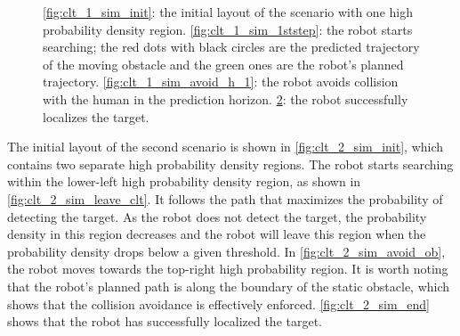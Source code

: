 \documentclass[twocolumn,10pt]{asme2e}
\begin{document}
\begin{figure}
\begin{subfigure}[b]{0.2\textwidth}
		\caption{}\label{fig:clt_1_sim_end}
	\end{subfigure}
	\caption{\cref{fig:clt_1_sim_init}: the initial layout of the scenario with one high probability density region. \cref{fig:clt_1_sim_1ststep}: the robot starts searching; the red dots with black circles are the predicted trajectory of the moving obstacle and the green ones are the robot's planned trajectory. \cref{fig:clt_1_sim_avoid_h_1}: the robot avoids collision with the human in the prediction horizon. \cref{fig:clt_1_sim_end}: the robot successfully localizes the target.}
\end{figure}

The initial layout of the second scenario is shown in \cref{fig:clt_2_sim_init}, which contains two separate high probability density regions.
The robot starts searching within the lower-left high probability density region, as shown in \cref{fig:clt_2_sim_leave_clt}.
It follows the path that maximizes the probability of detecting the target.
As the robot does not detect the target, the probability density in this region decreases and the robot will leave this region when the probability density drops below a given threshold.
In \cref{fig:clt_2_sim_avoid_ob}, the robot moves towards the top-right high probability region.
It is worth noting that the robot's planned path is along the boundary of the static obstacle, which shows that the collision avoidance is effectively enforced.
\cref{fig:clt_2_sim_end} shows that the robot has successfully localized the target.
\end{document}
